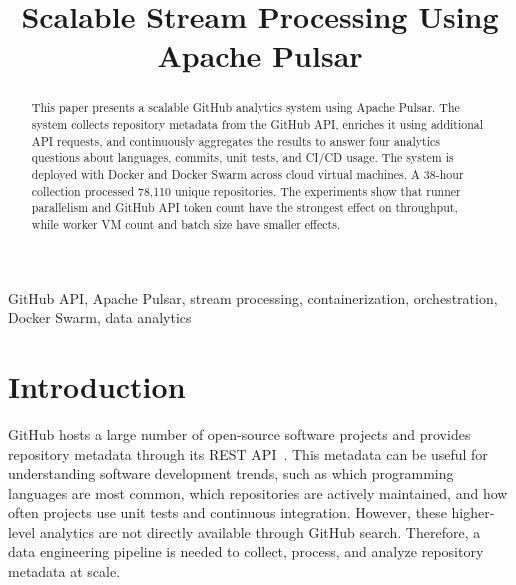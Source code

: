 \documentclass[conference]{IEEEtran}
\begin{document}
\title{Scalable Stream Processing Using Apache Pulsar}

\author{
}

\maketitle

\begin{abstract}
This paper presents a scalable GitHub analytics system using Apache Pulsar.
The system collects repository metadata from the GitHub API, enriches it using
additional API requests, and continuously aggregates the results to answer four
analytics questions about languages, commits, unit tests, and CI/CD usage. The
system is deployed with Docker and Docker Swarm across cloud virtual machines.
A 38-hour collection processed 78,110 unique repositories. The experiments show
that runner parallelism and GitHub API token count have the strongest effect on
throughput, while worker VM count and batch size have smaller effects.
\end{abstract}

\begin{IEEEkeywords}
GitHub API, Apache Pulsar, stream processing, containerization, orchestration, Docker Swarm, data analytics
\end{IEEEkeywords}

\section{Introduction}
GitHub hosts a large number of open-source software projects and provides
repository metadata through its REST API~\cite{github_rest_api}. This metadata can be useful for
understanding software development trends, such as which programming languages
are most common, which repositories are actively maintained, and how often
projects use unit tests and continuous integration. However, these higher-level
analytics are not directly available through GitHub search. Therefore, a data
engineering pipeline is needed to collect, process, and analyze repository
metadata at scale.
\end{document}
